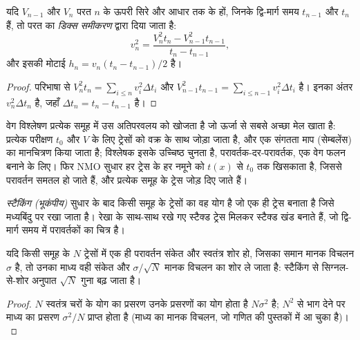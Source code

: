 \begin{theorem}[डिक्स समीकरण]\label{thm:b3:exploration-seismology:dix}
यदि $V_{n-1}$ और $V_n$ परत $n$ के ऊपरी सिरे और आधार तक के  हों,
जिनके द्वि-मार्ग समय $t_{n-1}$ और $t_n$ हैं, तो परत का 
\emph{डिक्स समीकरण} द्वारा दिया जाता है:
\[
  v_n^2 = \frac{V_n^2t_n - V_{n-1}^2t_{n-1}}{t_n - t_{n-1}} ,
\]
और इसकी मोटाई $h_n = v_n(t_n - t_{n-1})/2$ है।
\end{theorem}

\begin{proof}
परिभाषा से $V_n^2t_n = \sum_{i\le n}v_i^2\Delta t_i$ और $V_{n-1}^2t_{n-1}
= \sum_{i\le n-1}v_i^2\Delta t_i$ है। इनका अंतर $v_n^2\Delta t_n$ है, जहाँ
$\Delta t_n = t_n - t_{n-1}$ है।
\end{proof}

वेग विश्लेषण प्रत्येक समूह में उस अतिपरवलय को खोजता है जो ऊर्जा से सबसे अच्छा
मेल खाता है: प्रत्येक परीक्षण $t_0$ और $V$ के लिए ट्रेसों को वक्र के साथ जोड़ा जाता है, और
एक संगतता माप (सेम्बलेंस) का मानचित्रण किया जाता है; विश्लेषक इसके उच्चिष्ठ चुनता है,
परावर्तक-दर-परावर्तक, एक वेग फलन बनाने के लिए। फिर NMO सुधार
हर ट्रेस के हर नमूने को $t(x)$ से $t_0$ तक खिसकाता है, जिससे परावर्तन
समतल हो जाते हैं, और प्रत्येक समूह के ट्रेस जोड़ दिए जाते हैं।

\begin{definition}[स्टैकिंग (भूकंपीय)]\label{def:b3:exploration-seismology:stack}
\emph{स्टैकिंग (भूकंपीय)}  सुधार के बाद
किसी  समूह के ट्रेसों का वह योग है जो एक ही ट्रेस बनाता है
जिसे मध्यबिंदु पर रखा जाता है। रेखा के साथ-साथ रखे गए स्टैक्ड ट्रेस
मिलकर स्टैक्ड खंड बनाते हैं, जो द्वि-मार्ग समय में परावर्तकों का चित्र है।
\end{definition}

\begin{proposition}[स्टैक का लाभ]\label{prop:b3:exploration-seismology:sqrtN}
यदि किसी समूह के $N$ ट्रेसों में एक ही परावर्तन संकेत और स्वतंत्र
शोर हो, जिसका समान मानक विचलन $\sigma$ है, तो उनका माध्य वही संकेत
और $\sigma/\sqrt N$ मानक विचलन का शोर ले जाता है: स्टैकिंग से
सिग्नल-से-शोर अनुपात $\sqrt N$ गुना बढ़ जाता है।
\end{proposition}

\begin{proof}
$N$ स्वतंत्र चरों के योग का प्रसरण उनके प्रसरणों का योग होता है
$N\sigma^2$ है; $N^2$ से भाग देने पर माध्य का प्रसरण $\sigma^2/N$ प्राप्त होता है
(माध्य का मानक विचलन, जो गणित की
पुस्तकों में आ चुका है)।
\end{proof}

